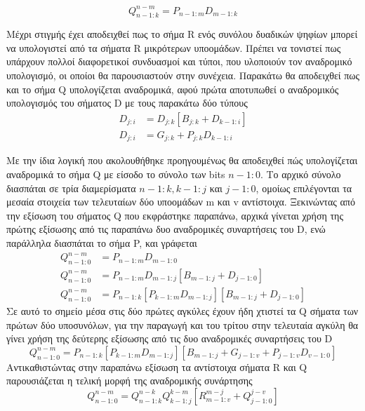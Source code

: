 \begin{equation}
    Q^{n-m}_{n-1:k} = P_{n-1:m}D_{m-1:k}
\end{equation}

Μέχρι στιγμής έχει αποδειχθεί πως το σήμα R ενός συνόλου δυαδικών ψηφίων
μπορεί να υπολογιστεί από τα σήματα R μικρότερων υποομάδων. Πρέπει
να τονιστεί πως υπάρχουν πολλοί διαφορετικοί συνδυασμοί και τύποι, που υλοποιούν 
τον αναδρομικό υπολογισμό, οι οποίοι θα παρουσιαστούν στην συνέχεια. 
Παρακάτω θα αποδειχθεί πως και το σήμα Q υπολογίζεται αναδρομικά, αφού πρώτα αποτυπωθεί ο 
αναδρομικός υπολογισμός του σήματος D με τους παρακάτω δύο τύπους 
\begin{equation}
\begin{split}
    D_{j:i} &= D_{j:k}[ B_{j:k} + D_{k-1:i} ] \\
    D_{j:i} &= G_{j:k} + P_{j:k}D_{k-1:i}
\end{split}
\end{equation}

Με την ίδια λογική που ακολουθήθηκε προηγουμένως θα αποδειχθεί πώς υπολογίζεται 
αναδρομικά το σήμα Q με είσοδο το σύνολο των bits $n-1:0$.
Το αρχικό σύνολο διασπάται σε τρία διαμερίσματα $n-1:k , k-1:j$ και $j-1:0$, ομοίως επιλέγονται
τα μεσαία στοιχεία των τελευταίων δύο υποομάδων m και v αντίστοιχα. Ξεκινώντας από την
εξίσωση του σήματος Q που εκφράστηκε παραπάνω, αρχικά γίνεται χρήση της 
πρώτης εξίσωσης από τις παραπάνω δυο αναδρομικές συναρτήσεις του D, ενώ παράλληλα
διασπάται το σήμα P, και γράφεται 
\begin{equation*}
\begin{split}
    Q^{n-m}_{n-1:0} &= P_{n-1:m}D_{m-1:0}\\
    Q^{n-m}_{n-1:0} &= P_{n-1:m}D_{m-1:j}[B_{m-1:j}+D_{j-1:0}] \\
    Q^{n-m}_{n-1:0} &= P_{n-1:k}[P_{k-1:m}D_{m-1:j}][B_{m-1:j}+D_{j-1:0}]
\end{split}
\end{equation*}
Σε αυτό το σημείο μέσα στις δύο πρώτες αγκύλες έχουν ήδη χτιστεί τα Q σήματα
των πρώτων δύο υποσυνόλων, για την παραγωγή και του τρίτου στην τελευταία αγκύλη
θα γίνει χρήση της δεύτερης εξίσωσης από τις δυο αναδρομικές συναρτήσεις του D
\begin{equation*}
    Q^{n-m}_{n-1:0} = P_{n-1:k}[P_{k-1:m}D_{m-1:j}][B_{m-1:j}+G_{j-1:v}+P_{j-1:v}D_{v-1:0}]
\end{equation*}
Αντικαθιστώντας στην παραπάνω εξίσωση τα αντίστοιχα σήματα R και Q παρουσιάζεται η τελική 
μορφή της αναδρομικής συνάρτησης 
\begin{equation}
    Q^{n-m}_{n-1:0} = Q^{n-k}_{n-1:k}Q^{k-m}_{k-1:j}[R^{m-j}_{m-1:v}+Q^{j-v}_{j-1:0}]
\end{equation}








